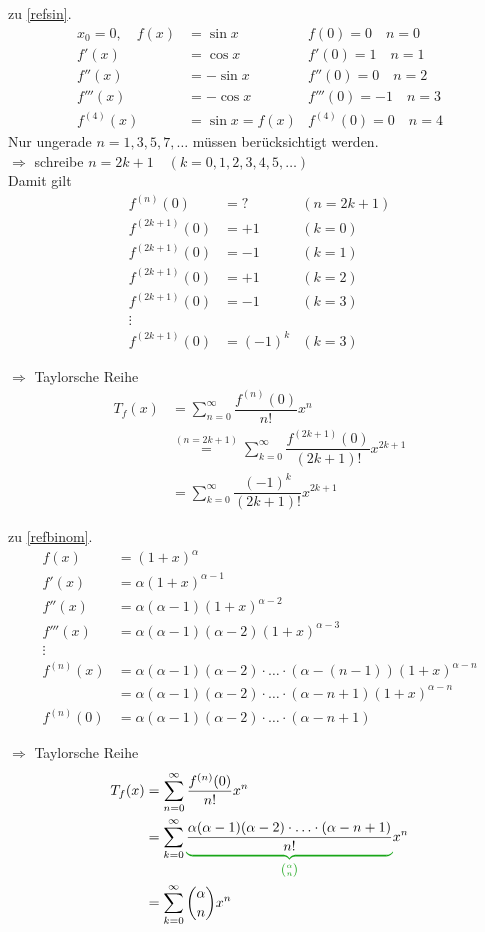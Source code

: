 zu \ref{refsin}.
\begin{align*}
x_0=0,\quad f(x)&=\sin x & f(0)=0\quad n=0\\
f'(x)&=\cos x & f'(0)=1\quad n=1\\
f''(x)&=-\sin x & f''(0)=0\quad n=2\\
f'''(x)&=-\cos x & f'''(0)=-1\quad n=3\\
f^{(4)}(x)&=\sin x = f(x) & f^{(4)}(0)=0\quad n=4
\end{align*}
Nur ungerade $n=1,3,5,7,\ldots$ müssen berücksichtigt werden.\\
$\Rightarrow$ schreibe $n=2k+1\quad(k=0,1,2,3,4,5,\ldots)$\\
Damit gilt
\begin{align*}
f^{(n)}(0)&=? & (n=2k+1)\\
f^{(2k+1)}(0)&=+1 & (k=0)\\
f^{(2k+1)}(0)&=-1 & (k=1)\\
f^{(2k+1)}(0)&=+1 & (k=2)\\
f^{(2k+1)}(0)&=-1 & (k=3)\\
\vdots\\
f^{(2k+1)}(0)&=(-1)^k & (k=3)
\end{align*}

$\Rightarrow$ Taylorsche Reihe
\begin{align*}
T_f(x)&=\sum\limits_{n=0}^{\infty}\dfrac{f^{(n)}(0)}{n!}x^n\\
&\stackrel{(n=2k+1)}{=}\sum\limits_{k=0}^{\infty}\dfrac{f^{(2k+1)}(0)}{(2k+1)!}x^{2k+1}\\
&=\sum\limits_{k=0}^{\infty}\dfrac{(-1)^k}{(2k+1)!}x^{2k+1}
\end{align*}

zu \ref{refbinom}.
\begin{align*}
f(x)&=(1+x)^\alpha\\
f'(x)&=\alpha(1+x)^{\alpha-1}\\
f''(x)&=\alpha(\alpha-1)(1+x)^{\alpha-2}\\
f'''(x)&=\alpha(\alpha-1)(\alpha-2)(1+x)^{\alpha-3}\\
\vdots\\
f^{(n)}(x)&=\alpha(\alpha-1)(\alpha-2)\cdot\ldots\cdot(\alpha-(n-1))(1+x)^{\alpha-n}\\
&=\alpha(\alpha-1)(\alpha-2)\cdot\ldots\cdot(\alpha-n+1)(1+x)^{\alpha-n}\\
f^{(n)}(0)&=\alpha(\alpha-1)(\alpha-2)\cdot\ldots\cdot(\alpha-n+1)
\end{align*}

$\Rightarrow$ Taylorsche Reihe
\begin{align*}
T_f(x)&=\sum\limits_{n=0}^{\infty}\dfrac{f^{(n)}(0)}{n!}x^n\\
&=\sum\limits_{k=0}^{\infty}\greenunderbrace{\dfrac{\alpha(\alpha-1)(\alpha-2)\cdot\ldots\cdot(\alpha-n+1)}{n!}}{\binom{\alpha}{n}}x^n\\
&=\sum\limits_{k=0}^{\infty}\binom{\alpha}{n}x^n
\end{align*}

